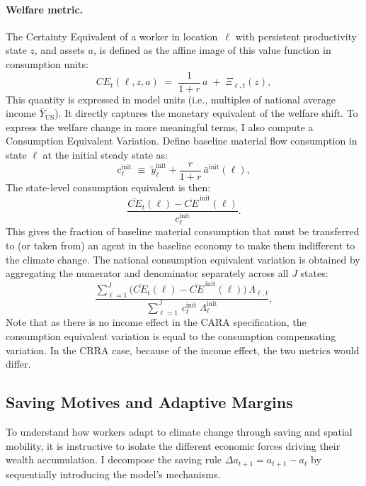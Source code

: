 \documentclass[12pt, a4paper]{article}
\begin{document}
\paragraph{Welfare metric.} The Certainty Equivalent of a worker in location~$\ell$ with persistent productivity state $z$, and assets $a$, is defined as the affine image of this value function in consumption units:
\begin{equation}
    CE_t(\ell, z, a) \;=\; \frac{1}{1+r}\, a \;+\; \Xi_{\ell,t}(z),
\end{equation}
This quantity is expressed in model units (i.e., multiples of national average income $\bar{Y}_{\text{US}}$). It directly captures the monetary equivalent of the welfare shift. To express the welfare change in more meaningful terms, I also compute a Consumption Equivalent Variation. Define baseline material flow consumption in state $\ell$ at the initial steady state as:
\begin{equation}\label{eq:base_flow_cons}
    c^{\text{init}}_{\ell} \;\equiv\; \tilde{y}^{\text{init}}_\ell + \frac{r}{1+r}\,\bar{a}^{\text{init}}(\ell),
\end{equation}
The state-level consumption equivalent is then:
\begin{equation}\label{eq:consumption_equivalent}
    \frac{\overline{CE}_t(\ell) -
          \overline{CE}^{\,\text{init}}(\ell)}{c^{\text{init}}_{\ell}}.
\end{equation}
This gives the fraction of baseline material consumption that must be transferred to (or taken from) an agent in the baseline economy to make them indifferent to the climate change. The national consumption equivalent variation is obtained by aggregating the numerator and denominator separately across all $J$ states:
\begin{equation}\label{eq:lambda_nat}
    \frac{\displaystyle\sum_{\ell=1}^{J}
      \bigl(\overline{CE}_t(\ell) -
            \overline{CE}^{\,\text{init}}(\ell)\bigr)\,
      \Lambda_{\ell,t}}
    {\displaystyle\sum_{\ell=1}^{J}\, c^{\text{init}}_{\ell}\;
      \Lambda^{\text{init}}_{\ell}},
\end{equation}
Note that as there is no income effect in the CARA specification, the consumption equivalent variation is equal to the consumption compensating variation. In the CRRA case, because of the income effect, the two metrics would differ.



\subsection{Saving Motives and Adaptive Margins}
To understand how workers adapt to climate change through saving and spatial mobility, it is instructive to isolate the different economic forces driving their wealth accumulation. I decompose the saving rule $\Delta a_{t+1} = a_{t+1} - a_t$ by sequentially introducing the model's mechanisms.
\end{document}
